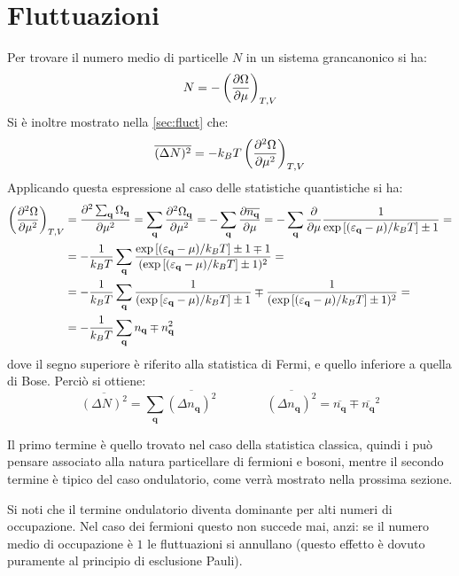 
\section{Fluttuazioni}
\label{sec:quantumfluct}

Per trovare il numero medio di particelle $ N $ in un sistema grancanonico si ha:
\[ N = - \left(\frac{\partial {\Omega}}{\partial {\mu}}\right)_{T,V} \]
Si è inoltre mostrato nella \cref{sec:fluct} che:
\[ \overline{(\Delta N)^2} = -k_B T \left(\frac{\partial {^2 \Omega}}{\partial {\mu^2}}\right)_{T,V} \]
Applicando questa espressione al caso delle statistiche quantistiche si ha:
\begin{align*}
\left(\frac{\partial {^2 \Omega}}{\partial {\mu^2}}\right)_{T,V} &= \frac{\partial {^2 \sum_{\textbf{q}} \Omega_{\textbf{q}}}}{\partial {\mu^2}} = \sum_{\textbf{q}} \frac{\partial {^2 \Omega_{\textbf{q}}}}{\partial {\mu^2}} = - \sum_{\textbf{q}} \frac{\partial {\overline{n_{\textbf{q}}}}}{\partial {\mu}} = - \sum_{\textbf{q}} \frac{\partial {}}{\partial {\mu}}  \frac{1}{\exp\left[(\varepsilon_{\textbf{q}} - \mu)/k_B T\right] \pm 1} =\\
&= - \frac{1}{k_B T} \sum_{\textbf{q}}  \frac{\exp\left[(\varepsilon_{\textbf{q}} - \mu)/k_B T\right] \pm 1 \mp 1}{(\exp\left[(\varepsilon_{\textbf{q}} - \mu)/k_B T\right] \pm 1)^2} =\\
& = - \frac{1}{k_B T} \sum_{\textbf{q}}  \frac{1}{(\exp\left[\varepsilon_{\textbf{q}} - \mu)/k_B T\right] \pm 1} \mp \frac{1}{(\exp\left[(\varepsilon_{\textbf{q}} - \mu)/k_B T\right] \pm 1)^2} =\\
&= - \frac{1}{k_B T} \sum_{\textbf{q}} n_{\textbf{q}} \mp n_{\textbf{q}}^2
\end{align*}
dove il segno superiore è riferito alla statistica di Fermi, e quello inferiore a quella di Bose. Perciò si ottiene:
\[ \overline{(\Delta N)^2} = \sum_{\textbf{q}} \overline{(\Delta n_{\textbf{q}})^2} \qquad \qquad  \overline{(\Delta n_{\textbf{q}})^2} = \overline{n_{\textbf{q}}} \mp \overline{n_{\textbf{q}}}^2 \]

Il primo termine è quello trovato nel caso della statistica classica, quindi i può pensare associato alla natura particellare di fermioni e bosoni, mentre il secondo termine è tipico del caso ondulatorio, come verrà mostrato nella prossima sezione.

Si noti che il termine ondulatorio diventa dominante per alti numeri di occupazione. Nel caso dei fermioni questo non succede mai, anzi: se il numero medio di occupazione è $ 1 $ le fluttuazioni si annullano (questo effetto è dovuto puramente al principio di esclusione Pauli).

